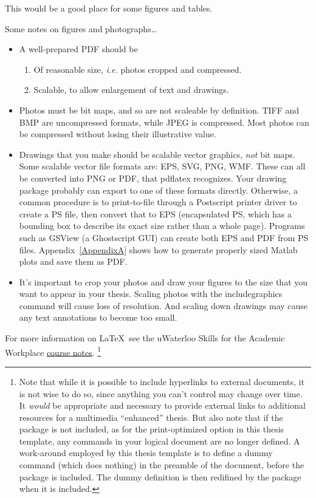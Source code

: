 
This would be a good place for some figures and tables.

Some notes on figures and photographs\ldots

\begin{itemize}
\item A well-prepared PDF should be 
  \begin{enumerate}
    \item Of reasonable size, {\it i.e.} photos cropped and compressed.
    \item Scalable, to allow enlargement of text and drawings. 
  \end{enumerate} 
\item Photos must be bit maps, and so are not scaleable by definition. TIFF and
BMP are uncompressed formats, while JPEG is compressed. Most photos can be
compressed without losing their illustrative value.
\item Drawings that you make should be scalable vector graphics, \emph{not} 
bit maps. Some scalable vector file formats are: EPS, SVG, PNG, WMF. These can
all be converted into PNG or PDF, that pdflatex recognizes. Your drawing 
package probably can export to one of these formats directly. Otherwise, a 
common procedure is to print-to-file through a Postscript printer driver to 
create a PS file, then convert that to EPS (encapsulated PS, which has a 
bounding box to describe its exact size rather than a whole page). 
Programs such as GSView (a Ghostscript GUI) can create both EPS and PDF from PS files.
Appendix~\ref{AppendixA} shows how to generate properly sized Matlab plots and save them as PDF.
\item It's important to crop your photos and draw your figures to the size that
you want to appear in your thesis. Scaling photos with the 
includegraphics command will cause loss of resolution. And scaling down 
drawings may cause any text annotations to become too small.
\end{itemize}
 
For more information on \LaTeX\, see the uWaterloo Skills for the Academic Workplace  \href{https://uwaterloo.ca/information-systems-technology/services/electronic-thesis-preparation-and-submission-support/ethesis-guide/creating-pdf-version-your-thesis/creating-pdf-files-using-latex/latex-ethesis-and-large-documents}{course notes}. 
\footnote{
Note that while it is possible to include hyperlinks to external documents,
it is not wise to do so, since anything you can't control may change over time. 
It \emph{would} be appropriate and necessary to provide external links to 
additional resources for a multimedia ``enhanced'' thesis. 
But also note that if the  package is not included, 
as for the print-optimized option in this thesis template, any  
commands in your logical document are no longer defined.
A work-around employed by this thesis template is to define a dummy  
command (which does nothing) in the preamble of the document, 
before the  package is included. 
The dummy definition is then redifined by the
 package when it is included.
}

